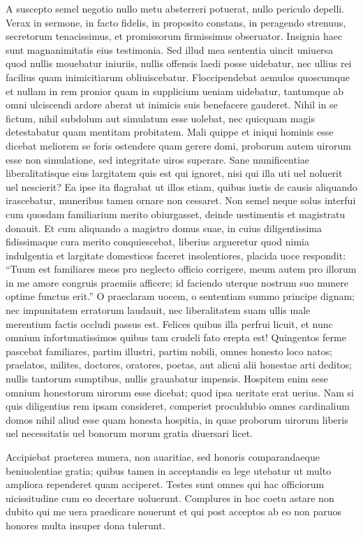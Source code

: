 \documentclass[a5paper,twoside]{article}
\begin{document}
A suscepto semel negotio nullo metu absterreri potuerat, nullo periculo depelli. Verax in sermone, in facto fidelis, in proposito constans, in peragendo strenuus, secretorum tenacissimus, et promissorum firmissimus obseruator. Insignia haec sunt magnanimitatis eius testimonia. Sed illud mea sententia uincit uniuersa quod nullis mouebatur iniuriis, nullis offensis laedi posse uidebatur, nec ullius rei facilius quam inimicitiarum obliuiscebatur. Floccipendebat aemulos quoscumque et nullam in rem pronior quam in supplicium ueniam uidebatur, tantumque ab omni ulciscendi ardore aberat ut inimicis suis benefacere gauderet. Nihil in se fictum, nihil subdolum aut simulatum esse uolebat, nec quicquam magis detestabatur quam mentitam probitatem. Mali quippe et iniqui hominis esse dicebat meliorem se foris ostendere quam gerere domi, proborum autem uirorum esse non simulatione, sed integritate uiros superare. Sane munificentiae liberalitatisque eius largitatem quis est qui ignoret, nisi qui illa uti uel noluerit uel nescierit? Ea ipse ita flagrabat ut illos etiam, quibus iustis de causis aliquando irascebatur, muneribus tamen ornare non cessaret. Non semel neque solus interfui cum quosdam familiarium merito obiurgasset, deinde uestimentis et magistratu donauit. Et cum aliquando a magistro domus suae, in cuius diligentissima fidissimaque cura merito conquiescebat, liberius argueretur quod nimia indulgentia et largitate domesticos faceret insolentiores, placida uoce respondit: ``Tuum est familiares meos pro neglecto officio corrigere, meum autem pro illorum in me amore congruis praemiis afficere; id faciendo uterque nostrum suo munere optime functus erit.'' O praeclaram uocem, o sententiam summo principe dignam; nec impunitatem erratorum laudauit, nec liberalitatem suam ullis male merentium factis occludi passus est. Felices quibus illa perfrui licuit, et nunc omnium infortunatissimos quibus tam crudeli fato erepta est! Quingentos ferme pascebat familiares, partim illustri, partim nobili, omnes honesto loco natos; praelatos, milites, doctores, oratores, poetas, aut alicui alii honestae arti deditos; nullis tantorum sumptibus, nullis grauabatur impensis. Hospitem enim sese omnium honestorum uirorum esse dicebat; quod ipsa ueritate erat uerius. Nam si quis diligentius rem ipsam consideret, comperiet proculdubio omnes cardinalium domos nihil aliud esse quam honesta hospitia, in quae proborum uirorum liberis uel necessitatis uel bonorum morum gratia diuersari licet.

Accipiebat praeterea munera, non auaritiae, sed honoris comparandaeque beniuolentiae gratia; quibus tamen in acceptandis ea lege utebatur ut multo ampliora rependeret quam acciperet. Testes sunt omnes qui hac officiorum uicissitudine cum eo decertare uoluerunt. Complures in hoc coetu astare non dubito qui me uera praedicare nouerunt et qui post acceptos ab eo non paruos honores multa insuper dona tulerunt.
\end{document}
